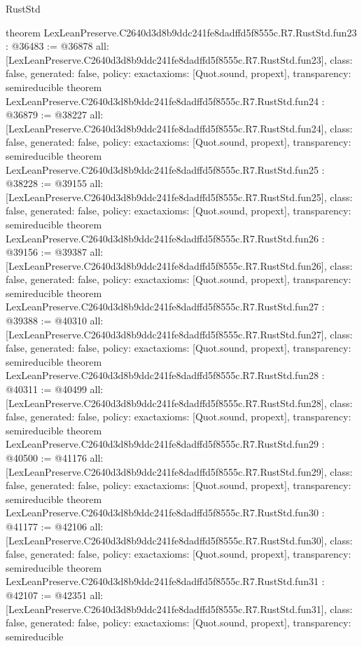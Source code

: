 \begin{lexlean}{RustStd}
\begin{coremodule}
{}
theorem LexLeanPreserve.C2640d3d8b9ddc241fe8dadffd5f8555c.R7.RustStd.fun23 : @36483 := @36878 {
  all: [LexLeanPreserve.C2640d3d8b9ddc241fe8dadffd5f8555c.R7.RustStd.fun23],
  class: false,
  generated: false,
  policy: exact{axioms: [Quot.sound, propext]},
  transparency: semireducible
}
theorem LexLeanPreserve.C2640d3d8b9ddc241fe8dadffd5f8555c.R7.RustStd.fun24 : @36879 := @38227 {
  all: [LexLeanPreserve.C2640d3d8b9ddc241fe8dadffd5f8555c.R7.RustStd.fun24],
  class: false,
  generated: false,
  policy: exact{axioms: [Quot.sound, propext]},
  transparency: semireducible
}
theorem LexLeanPreserve.C2640d3d8b9ddc241fe8dadffd5f8555c.R7.RustStd.fun25 : @38228 := @39155 {
  all: [LexLeanPreserve.C2640d3d8b9ddc241fe8dadffd5f8555c.R7.RustStd.fun25],
  class: false,
  generated: false,
  policy: exact{axioms: [Quot.sound, propext]},
  transparency: semireducible
}
theorem LexLeanPreserve.C2640d3d8b9ddc241fe8dadffd5f8555c.R7.RustStd.fun26 : @39156 := @39387 {
  all: [LexLeanPreserve.C2640d3d8b9ddc241fe8dadffd5f8555c.R7.RustStd.fun26],
  class: false,
  generated: false,
  policy: exact{axioms: [Quot.sound, propext]},
  transparency: semireducible
}
theorem LexLeanPreserve.C2640d3d8b9ddc241fe8dadffd5f8555c.R7.RustStd.fun27 : @39388 := @40310 {
  all: [LexLeanPreserve.C2640d3d8b9ddc241fe8dadffd5f8555c.R7.RustStd.fun27],
  class: false,
  generated: false,
  policy: exact{axioms: [Quot.sound, propext]},
  transparency: semireducible
}
theorem LexLeanPreserve.C2640d3d8b9ddc241fe8dadffd5f8555c.R7.RustStd.fun28 : @40311 := @40499 {
  all: [LexLeanPreserve.C2640d3d8b9ddc241fe8dadffd5f8555c.R7.RustStd.fun28],
  class: false,
  generated: false,
  policy: exact{axioms: [Quot.sound, propext]},
  transparency: semireducible
}
theorem LexLeanPreserve.C2640d3d8b9ddc241fe8dadffd5f8555c.R7.RustStd.fun29 : @40500 := @41176 {
  all: [LexLeanPreserve.C2640d3d8b9ddc241fe8dadffd5f8555c.R7.RustStd.fun29],
  class: false,
  generated: false,
  policy: exact{axioms: [Quot.sound, propext]},
  transparency: semireducible
}
theorem LexLeanPreserve.C2640d3d8b9ddc241fe8dadffd5f8555c.R7.RustStd.fun30 : @41177 := @42106 {
  all: [LexLeanPreserve.C2640d3d8b9ddc241fe8dadffd5f8555c.R7.RustStd.fun30],
  class: false,
  generated: false,
  policy: exact{axioms: [Quot.sound, propext]},
  transparency: semireducible
}
theorem LexLeanPreserve.C2640d3d8b9ddc241fe8dadffd5f8555c.R7.RustStd.fun31 : @42107 := @42351 {
  all: [LexLeanPreserve.C2640d3d8b9ddc241fe8dadffd5f8555c.R7.RustStd.fun31],
  class: false,
  generated: false,
  policy: exact{axioms: [Quot.sound, propext]},
  transparency: semireducible
}
\end{coremodule}
\end{lexlean}
